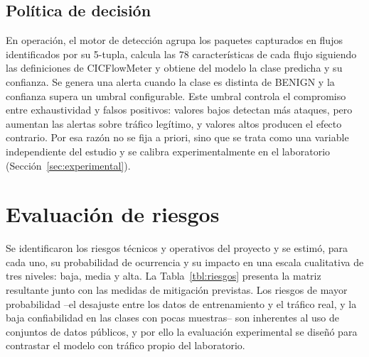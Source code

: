 \subsection{Política de decisión}

En operación, el motor de detección agrupa los paquetes capturados en flujos identificados por su 5-tupla, calcula las 78 características de cada flujo siguiendo las definiciones de CICFlowMeter y obtiene del modelo la clase predicha y su confianza. Se genera una alerta cuando la clase es distinta de BENIGN y la confianza supera un umbral configurable. Este umbral controla el compromiso entre exhaustividad y falsos positivos: valores bajos detectan más ataques, pero aumentan las alertas sobre tráfico legítimo, y valores altos producen el efecto contrario. Por esa razón no se fija a priori, sino que se trata como una variable independiente del estudio y se calibra experimentalmente en el laboratorio (Sección~\ref{sec:experimental}).

\section{Evaluación de riesgos}
\label{sec:riesgos}

Se identificaron los riesgos técnicos y operativos del proyecto y se estimó, para cada uno, su probabilidad de ocurrencia y su impacto en una escala cualitativa de tres niveles: baja, media y alta. La Tabla~\ref{tbl:riesgos} presenta la matriz resultante junto con las medidas de mitigación previstas. Los riesgos de mayor probabilidad --el desajuste entre los datos de entrenamiento y el tráfico real, y la baja confiabilidad en las clases con pocas muestras-- son inherentes al uso de conjuntos de datos públicos, y por ello la evaluación experimental se diseñó para contrastar el modelo con tráfico propio del laboratorio.

